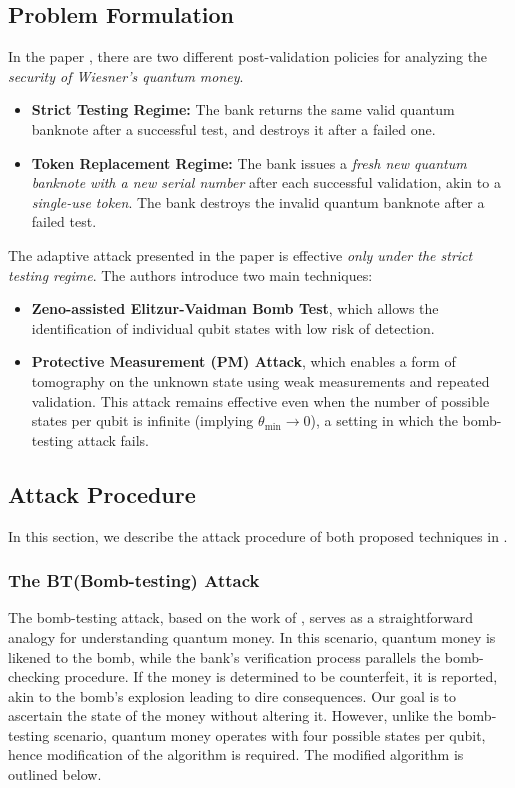 \documentclass{article} %
\begin{document}
\subsection{Problem Formulation}

In the paper \citep{Nagaj2016Adaptive}, there are two different post-validation policies for analyzing the \emph{security of Wiesner’s quantum money}.
\begin{itemize}
    \item \textbf{Strict Testing Regime:} The bank returns the same valid quantum banknote after a successful test, and destroys it after a failed one.
    \item \textbf{Token Replacement Regime:} The bank issues a \emph{fresh new quantum banknote with a new serial number} after each successful validation, akin to a \emph{single-use token}. The bank destroys the invalid quantum banknote after a failed test.
\end{itemize}

The adaptive attack presented in the paper \citep{Nagaj2016Adaptive} is effective \emph{only under the strict testing regime}. The authors introduce two main techniques:
\begin{itemize}
    \item \textbf{Zeno-assisted Elitzur-Vaidman Bomb Test}, which allows the identification of individual qubit states with low risk of detection.
    \item \textbf{Protective Measurement (PM) Attack}, which enables a form of tomography on the unknown state using weak measurements and repeated validation. This attack remains effective even when the number of possible states per qubit is infinite (implying $\theta_{\min} \to 0$), a setting in which the bomb-testing attack fails.
\end{itemize}




\newpage

\subsection{Attack Procedure}

In this section, we describe the attack procedure of both proposed techniques in \citep{Nagaj2016Adaptive}.

\subsubsection{The BT(Bomb-testing) Attack}
The bomb-testing attack, based on the work of \citep{zeno}, serves as a straightforward analogy for understanding quantum money. In this scenario, quantum money is likened to the bomb, while the bank's verification process parallels the bomb-checking procedure. If the money is determined to be counterfeit, it is reported, akin to the bomb's explosion leading to dire consequences. Our goal is to ascertain the state of the money without altering it. However, unlike the bomb-testing scenario, quantum money operates with four possible states per qubit, hence modification of the algorithm is required. The modified algorithm is outlined below.
\end{document}
